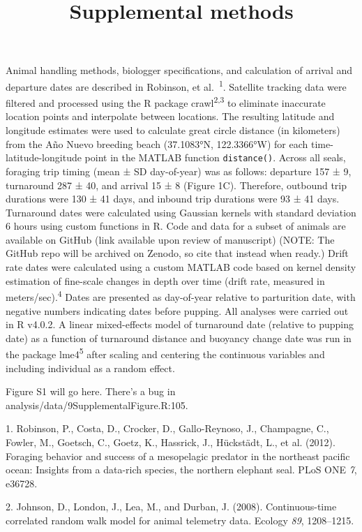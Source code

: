 \documentclass[
]{article}
\title{Supplemental methods}
\author{}
\date{\vspace{-2.5em}}
\begin{document}
\maketitle

Animal handling methods, biologger specifications, and calculation of
arrival and departure dates are described in Robinson, et
al.~\textsuperscript{1}. Satellite tracking data were filtered and
processed using the R package crawl\textsuperscript{2,3} to eliminate
inaccurate location points and interpolate between locations. The
resulting latitude and longitude estimates were used to calculate great
circle distance (in kilometers) from the Año Nuevo breeding beach
(37.1083°N, 122.3366°W) for each time-latitude-longitude point in the
MATLAB function \texttt{distance()}. Across all seals, foraging trip
timing (mean ± SD day-of-year) was as follows: departure 157 ± 9,
turnaround 287 ± 40, and arrival 15 ± 8 (Figure 1C). Therefore, outbound
trip durations were 130 ± 41 days, and inbound trip durations were 93 ±
41 days. Turnaround dates were calculated using Gaussian kernels with
standard deviation 6 hours using custom functions in R. Code and data
for a subset of animals are available on GitHub (link available upon
review of manuscript) (NOTE: The GitHub repo will be archived on Zenodo,
so cite that instead when ready.) Drift rate dates were calculated using
a custom MATLAB code based on kernel density estimation of fine-scale
changes in depth over time (drift rate, measured in
meters/sec).\textsuperscript{4} Dates are presented as day-of-year
relative to parturition date, with negative numbers indicating dates
before pupping. All analyses were carried out in R v4.0.2. A linear
mixed-effects model of turnaround date (relative to pupping date) as a
function of turnaround distance and buoyancy change date was run in the
package lme4\textsuperscript{5} after scaling and centering the
continuous variables and including individual as a random effect.

Figure S1 will go here. There's a bug in
analysis/data/9SupplementalFigure.R:105.

\hypertarget{refs}{}
\leavevmode\hypertarget{ref-robinson2012}{}%
1. Robinson, P., Costa, D., Crocker, D., Gallo-Reynoso, J., Champagne,
C., Fowler, M., Goetsch, C., Goetz, K., Hassrick, J., Hückstädt, L., et
al. (2012). Foraging behavior and success of a mesopelagic predator in
the northeast pacific ocean: Insights from a data-rich species, the
northern elephant seal. PLoS ONE \emph{7}, e36728.

\leavevmode\hypertarget{ref-johnson2008}{}%
2. Johnson, D., London, J., Lea, M., and Durban, J. (2008).
Continuous-time correlated random walk model for animal telemetry data.
Ecology \emph{89}, 1208--1215.
\end{document}
